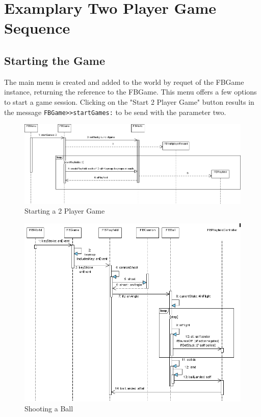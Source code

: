 \section{Examplary Two Player Game Sequence}
\subsection{Starting the Game}
The main menu is created and added to the world by requet of the FBGame instance,
returning the reference to the FBGame. This menu offers a few options to start 
a game session. Clicking on the "Start 2 Player Game" button results in the message
\lstinline!FBGame>>startGames:! to be send with the parameter two.
%
\begin{figure}[bt]
  \begin{center}
    \includegraphics[width=\linewidth]{images/Starting2PlayerGame.png}
  \end{center}
  \caption{Starting a 2 Player Game}
  \label{fig:Starting2PlayerGame}
\end{figure}
%
%
\begin{figure}[bt]
  \begin{center}
    \includegraphics[width=\linewidth]{images/ShootingABall.png}
  \end{center}
  \caption{Shooting a Ball}
  \label{fig:ShootingABall}
\end{figure}
